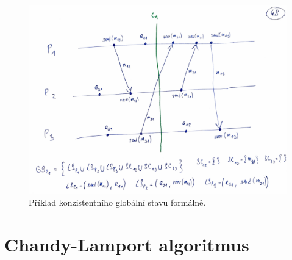 \begin{figure}[H]
    \centering
    \includegraphics[width=1\linewidth]{example_consistent_state.pdf}
    \caption{Příklad konzistentního globální stavu formálně.}
    \label{48_example_consistent_state}
\end{figure}


\section{Chandy-Lamport algoritmus}

